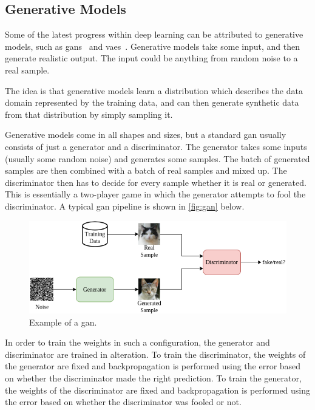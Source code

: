 \subsection{Generative Models}
Some of the latest progress within deep learning can be attributed to generative models, such as \glspl*{gan}~\cite{gan} and \glspl*{vae}~\cite{vae}. Generative models take some input, and then generate realistic output. The input could be anything from random noise to a real sample.
\par
The idea is that generative models learn a distribution which describes the data domain represented by the training data, and can then generate synthetic data from that distribution by simply sampling it.
\par
Generative models come in all shapes and sizes, but a standard \gls*{gan} usually consists of just a generator and a discriminator. The generator takes some inputs (usually some random noise) and generates some samples. The batch of generated samples are then combined with a batch of real samples and mixed up. The discriminator then has to decide for every sample whether it is real or generated. This is essentially a two-player game in which the generator attempts to fool the discriminator. A typical \gls*{gan} pipeline is shown in \autoref{fig:gan} below.
\begin{figure}[H]
    \centering
    \includegraphics[width=\linewidth]{resources/related_works/gan.png}
    \caption[Gan Example]{Example of a \gls*{gan}.}
    \label{fig:gan}
\end{figure}
In order to train the weights in such a configuration, the generator and discriminator are trained in alteration. To train the discriminator, the weights of the generator are fixed and backpropagation is performed using the error based on whether the discriminator made the right prediction. To train the generator, the weights of the discriminator are fixed and backpropagation is performed using the error based on whether the discriminator was fooled or not.
\par
